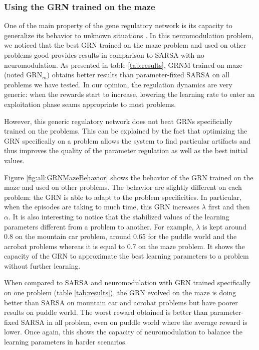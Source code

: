 \subsubsection{Using the GRN trained on the maze}
One of the main property of the gene regulatory network is its capacity to generalize its behavior to unknown situations \cite{sanchez2014gene}. In this neuromodulation problem, we noticed that the best GRN trained on the maze problem and used on other problems good provides results in comparison to SARSA with no neuromodulation. As presented in table \ref{tab:results}, GRNM trained on maze (noted GRN$_{m}$) obtains better results than parameter-fixed SARSA on all problems we have tested. In our opinion, the regulation dynamics are very generic: when the rewards start to increase, lowering the learning rate to enter an exploitation phase seams appropriate to most problems.

However, this generic regulatory network does not beat GRNs specificially trained on the problems. This can be explained by the fact that optimizing the GRN specifically on a problem allows the system to find particular artifacts and thus improves the quality of the parameter regulation as well as the best initial values.

Figure \ref{fig:all:GRNMazeBehavior} shows the behavior of the GRN trained on the maze and used on other problems. The behavior are slightly different on each problem: the GRN is able to adapt to the problem specificities. In particular, when the episodes are taking to much time, this GRN increases $\lambda$ first and then $\alpha$. It is also interesting to notice that the stabilized values of the learning parameters different from a problem to another. For example, $\lambda$ is kept around 0.8 on the mountain car problem, around 0.65 for the puddle world and the acrobat problems whereas it is equal to 0.7 on the maze problem. It shows the capacity of the GRN to approximate the best learning parameters to a problem without further learning.

When compared to SARSA and neuromodulation with GRN trained specifically on one problem (table \ref{tab:results}), the GRN evolved on the maze is doing better than SARSA on mountain car and acrobat problems but have poorer results on puddle world. The worst reward obtained is better than parameter-fixed SARSA in all problem, even on puddle world where the average reward is lower. Once again, this shows the capacity of neuromodulation to balance the learning parameters in harder scenarios.


